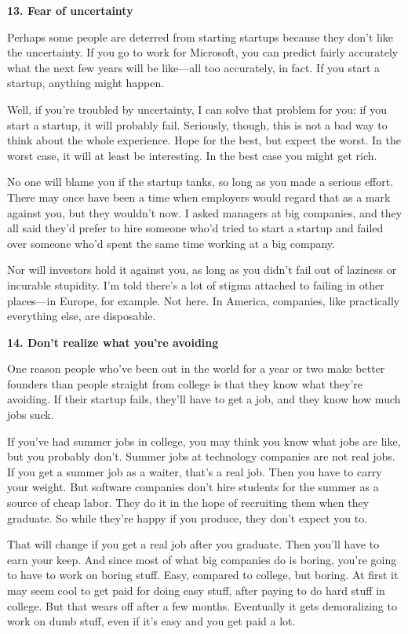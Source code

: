\documentclass[12pt]{book}
\begin{document}
\textbf{13. Fear of uncertainty}

Perhaps some people are deterred from starting startups because they
don't like the uncertainty. If you go to work for Microsoft, you can
predict fairly accurately what the next few years will be like---all too
accurately, in fact. If you start a startup, anything might happen.

Well, if you're troubled by uncertainty, I can solve that problem for
you: if you start a startup, it will probably fail. Seriously, though,
this is not a bad way to think about the whole experience. Hope for the
best, but expect the worst. In the worst case, it will at least be
interesting. In the best case you might get rich.

No one will blame you if the startup tanks, so long as you made a
serious effort. There may once have been a time when employers would
regard that as a mark against you, but they wouldn't now. I asked
managers at big companies, and they all said they'd prefer to hire
someone who'd tried to start a startup and failed over someone who'd
spent the same time working at a big company.

Nor will investors hold it against you, as long as you didn't fail out
of laziness or incurable stupidity. I'm told there's a lot of stigma
attached to failing in other places---in Europe, for example. Not here.
In America, companies, like practically everything else, are disposable.

\textbf{14. Don't realize what you're avoiding}

One reason people who've been out in the world for a year or two make
better founders than people straight from college is that they know what
they're avoiding. If their startup fails, they'll have to get a job, and
they know how much jobs suck.

If you've had summer jobs in college, you may think you know what jobs
are like, but you probably don't. Summer jobs at technology companies
are not real jobs. If you get a summer job as a waiter, that's a real
job. Then you have to carry your weight. But software companies don't
hire students for the summer as a source of cheap labor. They do it in
the hope of recruiting them when they graduate. So while they're happy
if you produce, they don't expect you to.

That will change if you get a real job after you graduate. Then you'll
have to earn your keep. And since most of what big companies do is
boring, you're going to have to work on boring stuff. Easy, compared to
college, but boring. At first it may seem cool to get paid for doing
easy stuff, after paying to do hard stuff in college. But that wears off
after a few months. Eventually it gets demoralizing to work on dumb
stuff, even if it's easy and you get paid a lot.
\end{document}
